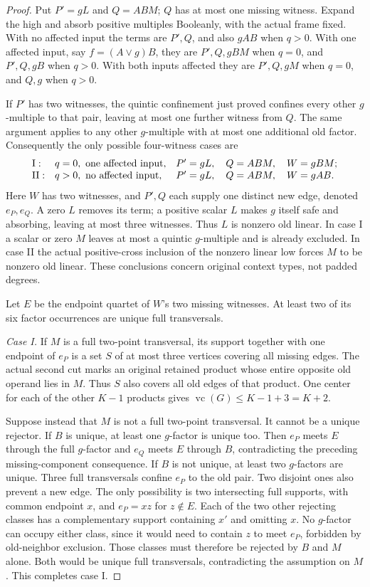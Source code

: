 \documentclass[11pt]{article}
\newcommand{\vc}{\operatorname{vc}}
\theoremstyle{definition}
\theoremstyle{remark}
\begin{document}
\begin{proof}
Put $P'=gL$ and $Q=ABM$; $Q$ has at most one missing witness. Expand the high and absorb positive multiples Booleanly, with the actual frame fixed. With no affected input the terms are $P',Q$, and also $gAB$ when $q>0$. With one affected input, say $f=(A\vee g)B$, they are $P',Q,gBM$ when $q=0$, and $P',Q,gB$ when $q>0$. With both inputs affected they are $P',Q,gM$ when $q=0$, and $Q,g$ when $q>0$.

If $P'$ has two witnesses, the quintic confinement just proved confines every other $g$-multiple to that pair, leaving at most one further witness from $Q$. The same argument applies to any other $g$-multiple with at most one additional old factor. Consequently the only possible four-witness cases are
\[
\begin{array}{lll}
\mathrm{I}:& q=0,\ \hbox{one affected input},
   & P'=gL,\quad Q=ABM,\quad W=gBM;\\
\mathrm{II}:& q>0,\ \hbox{no affected input},
   & P'=gL,\quad Q=ABM,\quad W=gAB.
\end{array}
\]
Here $W$ has two witnesses, and $P',Q$ each supply one distinct new edge, denoted $e_P,e_Q$. A zero $L$ removes its term; a positive scalar $L$ makes $g$ itself safe and absorbing, leaving at most three witnesses. Thus $L$ is nonzero old linear. In case I a scalar or zero $M$ leaves at most a quintic $g$-multiple and is already excluded. In case II the actual positive-cross inclusion of the nonzero linear low forces $M$ to be nonzero old linear. These conclusions concern original context types, not padded degrees.

Let $E$ be the endpoint quartet of $W$'s two missing witnesses. At least two of its six factor occurrences are unique full transversals.

\emph{Case I.} If $M$ is a full two-point transversal, its support together with one endpoint of $e_P$ is a set $S$ of at most three vertices covering all missing edges. The actual second cut marks an original retained product whose entire opposite old operand lies in $M$. Thus $S$ also covers all old edges of that product. One center for each of the other $K-1$ products gives $\vc(G)\le K-1+3=K+2$.

Suppose instead that $M$ is not a full two-point transversal. It cannot be a unique rejector. If $B$ is unique, at least one $g$-factor is unique too. Then $e_P$ meets $E$ through the full $g$-factor and $e_Q$ meets $E$ through $B$, contradicting the preceding missing-component consequence. If $B$ is not unique, at least two $g$-factors are unique. Three full transversals confine $e_P$ to the old pair. Two disjoint ones also prevent a new edge. The only possibility is two intersecting full supports, with common endpoint $x$, and $e_P=xz$ for $z\notin E$. Each of the two other rejecting classes has a complementary support containing $x'$ and omitting $x$. No $g$-factor can occupy either class, since it would need to contain $z$ to meet $e_P$, forbidden by old-neighbor exclusion. Those classes must therefore be rejected by $B$ and $M$ alone. Both would be unique full transversals, contradicting the assumption on $M$. This completes case I.


\end{proof}
\end{document}
